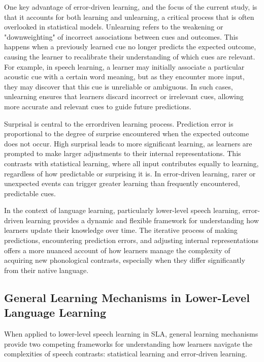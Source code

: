 One key advantage of error-driven learning, and the focus of the current study, is that it accounts for both learning and unlearning, a critical process that is often overlooked in statistical models. Unlearning refers to the weakening or "downweighting" of incorrect associations between cues and outcomes. This happens when a previously learned cue no longer predicts the expected outcome, causing the learner to recalibrate their understanding of which cues are relevant. For example, in speech learning, a learner may initially associate a particular acoustic cue with a certain word meaning, but as they encounter more input, they may discover that this cue is unreliable or ambiguous. In such cases, unlearning ensures that learners discard incorrect or irrelevant cues, allowing more accurate and relevant cues to guide future predictions.

Surprisal is central to the error\-driven learning process. Prediction error is proportional to the degree of surprise encountered when the expected outcome does not occur. High surprisal leads to more significant learning, as learners are prompted to make larger adjustments to their internal representations. This contrasts with statistical learning, where all input contributes equally to learning, regardless of how predictable or surprising it is. In error-driven learning, rarer or unexpected events can trigger greater learning than frequently encountered, predictable cues.

In the context of language learning, particularly lower-level speech learning, error-driven learning provides a dynamic and flexible framework for understanding how learners update their knowledge over time. The iterative process of making predictions, encountering prediction errors, and adjusting internal representations offers a more nuanced account of how learners manage the complexity of acquiring new phonological contrasts, especially when they differ significantly from their native language.

\subsection{General Learning Mechanisms in Lower-Level Language Learning}

When applied to lower-level speech learning in SLA, general learning mechanisms provide two competing frameworks for understanding how learners navigate the complexities of speech contrasts: statistical learning and error-driven learning.


